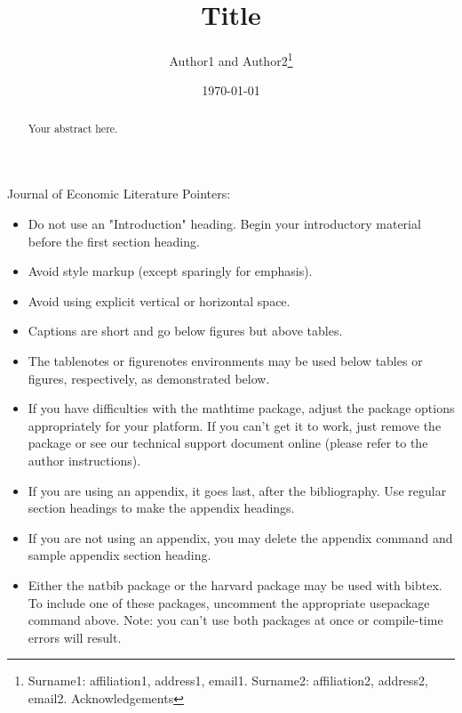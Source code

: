 \documentclass[JEL]{AEA}
\begin{document}
\title{Title}
\author{Author1 and Author2\thanks{%
Surname1: affiliation1, address1, email1. Surname2: affiliation2, address2,
email2. Acknowledgements}}
\date{\today}
\JEL{}
\Keywords{}

\begin{abstract}
Your abstract here.
\end{abstract}

\maketitle

Journal of Economic Literature Pointers:

\begin{itemize}
\item Do not use an "Introduction" heading. Begin your introductory material
before the first section heading.

\item Avoid style markup (except sparingly for emphasis).

\item Avoid using explicit vertical or horizontal space.

\item Captions are short and go below figures but above tables.

\item The tablenotes or figurenotes environments may be used below tables
or figures, respectively, as demonstrated below.

\item If you have difficulties with the mathtime package, adjust the package
options appropriately for your platform. If you can't get it to work, just
remove the package or see our technical support document online (please
refer to the author instructions).

\item If you are using an appendix, it goes last, after the bibliography.
Use regular section headings to make the appendix headings.

\item If you are not using an appendix, you may delete the appendix command
and sample appendix section heading.

\item Either the natbib package or the harvard package may be used with bibtex.
To include one of these packages, uncomment the appropriate usepackage command
above. Note: you can't use both packages at once or compile-time errors will result.

\end{itemize}
\end{document}
